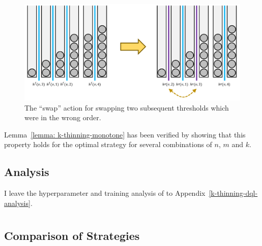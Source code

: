 \begin{figure}
    \centering
    \includegraphics[scale=0.5]{Chapter4/Figs/k_thinning_swap.pdf}
    \caption{The ``swap'' action for \KThinning swapping two subsequent thresholds which were in the wrong order.}
    \label{k-thinning-swap-action}
\end{figure}


\begin{remark}
Lemma~\ref{lemma: k-thinning-monotone} has been verified by showing that this property holds for the optimal \DP strategy for several combinations of $n$, $m$ and $k$.
\end{remark}


\subsection{\DQL Analysis} \label{dql-analysis-k-thinning}


I leave the hyperparameter and training analysis of \DQL to Appendix~\ref{k-thinning-dql-analysis}.

\section{\GraphicalTwoChoice}


\subsection{Comparison of Strategies} \label{graphical-two-choice-comparison}


